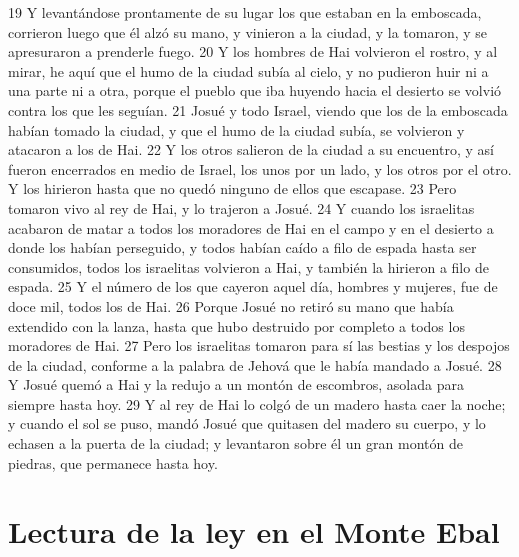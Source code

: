 19 Y levantándose prontamente de su lugar los que estaban en la emboscada, corrieron luego que él alzó su mano, y vinieron a la ciudad, y la tomaron, y se apresuraron a prenderle fuego.
20 Y los hombres de Hai volvieron el rostro, y al mirar, he aquí que el humo de la ciudad subía al cielo, y no pudieron huir ni a una parte ni a otra, porque el pueblo que iba huyendo hacia el desierto se volvió contra los que les seguían.
21 Josué y todo Israel, viendo que los de la emboscada habían tomado la ciudad, y que el humo de la ciudad subía, se volvieron y atacaron a los de Hai.
22 Y los otros salieron de la ciudad a su encuentro, y así fueron encerrados en medio de Israel, los unos por un lado, y los otros por el otro. Y los hirieron hasta que no quedó ninguno de ellos que escapase.
23 Pero tomaron vivo al rey de Hai, y lo trajeron a Josué.
24 Y cuando los israelitas acabaron de matar a todos los moradores de Hai en el campo y en el desierto a donde los habían perseguido, y todos habían caído a filo de espada hasta ser consumidos, todos los israelitas volvieron a Hai, y también la hirieron a filo de espada.
25 Y el número de los que cayeron aquel día, hombres y mujeres, fue de doce mil, todos los de Hai.
26 Porque Josué no retiró su mano que había extendido con la lanza, hasta que hubo destruido por completo a todos los moradores de Hai.
27 Pero los israelitas tomaron para sí las bestias y los despojos de la ciudad, conforme a la palabra de Jehová que le había mandado a Josué.
28 Y Josué quemó a Hai y la redujo a un montón de escombros, asolada para siempre hasta hoy.
29 Y al rey de Hai lo colgó de un madero hasta caer la noche; y cuando el sol se puso, mandó Josué que quitasen del madero su cuerpo, y lo echasen a la puerta de la ciudad; y levantaron sobre él un gran montón de piedras, que permanece hasta hoy.

\section*{Lectura de la ley en el Monte Ebal}

